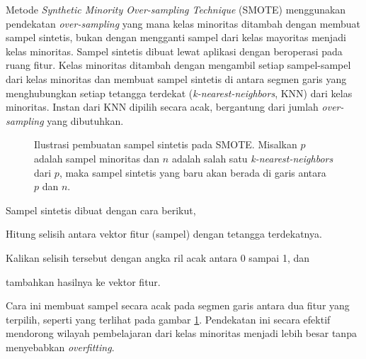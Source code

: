 Metode \textit{Synthetic Minority Over-sampling Technique} (SMOTE)
\cite{chawla2002smote} menggunakan pendekatan \textit{over-sampling} yang mana
kelas minoritas ditambah dengan membuat sampel sintetis, bukan dengan
mengganti sampel dari kelas mayoritas menjadi kelas minoritas.
Sampel sintetis dibuat lewat aplikasi dengan beroperasi pada
ruang fitur.
Kelas minoritas ditambah dengan mengambil setiap sampel-sampel dari kelas
minoritas dan membuat sampel sintetis di antara segmen garis yang menghubungkan
setiap tetangga terdekat (\textit{k-nearest-neighbors}, KNN) dari kelas
minoritas.
Instan dari KNN dipilih secara acak, bergantung dari jumlah
\textit{over-sampling} yang dibutuhkan.

\begin{figure}[htbp]
\centering
\setlength\fboxsep{4pt}
	\caption{
	Ilustrasi pembuatan sampel sintetis pada SMOTE.
	Misalkan $p$ adalah sampel minoritas dan $n$ adalah salah satu
	\textit{k-nearest-neighbors} dari $p$, maka
	sampel sintetis yang baru akan berada di garis antara $p$ dan $n$.
	}
	\label{fig:smote}
\end{figure}

Sampel sintetis dibuat dengan cara berikut,
\begin{compactitem}%
	\item Hitung selisih antara vektor fitur (sampel) dengan tetangga
	terdekatnya.
	\item Kalikan selisih tersebut dengan angka ril acak antara 0 sampai 1,
	dan
	\item tambahkan hasilnya ke vektor fitur.
\end{compactitem}

Cara ini membuat sampel secara acak pada segmen garis antara dua fitur yang
terpilih, seperti yang terlihat pada gambar \ref{fig:smote}.
Pendekatan ini secara efektif mendorong wilayah pembelajaran dari kelas
minoritas menjadi lebih besar tanpa menyebabkan \textit{overfitting}.
